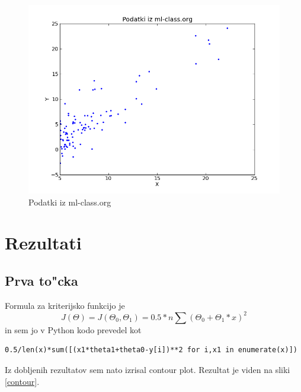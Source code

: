 \documentclass[a4paper,11pt]{article}
\begin{document}
\begin{figure}[H]
\begin{center}
\includegraphics[scale=0.3]{ml-data.png}
\caption{Podatki iz ml-class.org}
\end{center}
\label{mldata}
\end{figure}

\section{Rezultati}
\subsection{Prva to"cka}

Formula za kriterijsko funkcijo je 
\[
J(\Theta) = J(\Theta_0, \Theta_1) = 0.5 * n \sum (\Theta_0 + \Theta_1*x)^{2}
\]
in sem jo v Python kodo prevedel kot
\begin{verbatim}
0.5/len(x)*sum([(x1*theta1+theta0-y[i])**2 for i,x1 in enumerate(x)])
\end{verbatim}
Iz dobljenih rezultatov sem nato izrisal contour plot. Rezultat je viden na sliki \ref{contour}.
\end{document}
